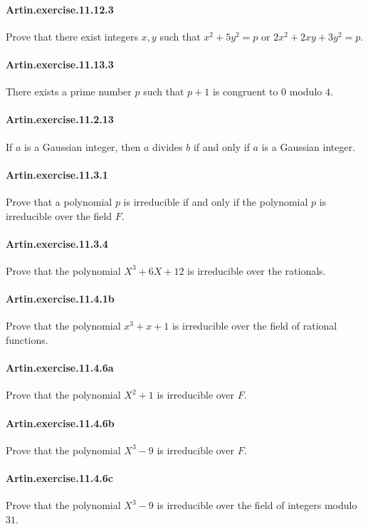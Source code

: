 \documentclass{article}
\begin{document}
\paragraph{Artin.exercise.11.12.3} Prove that there exist integers $x, y$ such that $x^2 + 5y^2 = p$ or $2x^2 + 2xy + 3y^2 = p$.

\paragraph{Artin.exercise.11.13.3} There exists a prime number $p$ such that $p+1$ is congruent to $0$ modulo $4$.

\paragraph{Artin.exercise.11.2.13} If $a$ is a Gaussian integer, then $a$ divides $b$ if and only if $a$ is a Gaussian integer.

\paragraph{Artin.exercise.11.3.1} Prove that a polynomial $p$ is irreducible if and only if the polynomial $p$ is irreducible over the field $F$.

\paragraph{Artin.exercise.11.3.4} Prove that the polynomial $X^3 + 6X + 12$ is irreducible over the rationals.

\paragraph{Artin.exercise.11.4.1b} Prove that the polynomial $x^3+x+1$ is irreducible over the field of rational functions.

\paragraph{Artin.exercise.11.4.6a} Prove that the polynomial $X^2+1$ is irreducible over $F$.

\paragraph{Artin.exercise.11.4.6b} Prove that the polynomial $X^3-9$ is irreducible over $F$.

\paragraph{Artin.exercise.11.4.6c} Prove that the polynomial $X^3 - 9$ is irreducible over the field of integers modulo $31$.
\end{document}
